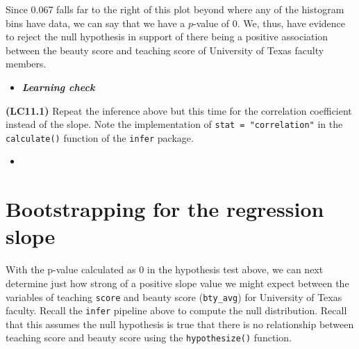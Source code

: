 \documentclass[12pt,]{krantz}
\makeatletter
\newenvironment{Shaded}{\begin{snugshade}}{\end{snugshade}}
\newcommand{\KeywordTok}[1]{\textcolor[rgb]{0.27,0.27,0.27}{\textbf{#1}}}
\newcommand{\DataTypeTok}[1]{\textcolor[rgb]{0.27,0.27,0.27}{#1}}
\newcommand{\DecValTok}[1]{\textcolor[rgb]{0.06,0.06,0.06}{#1}}
\newcommand{\StringTok}[1]{\textcolor[rgb]{0.5,0.5,0.5}{#1}}
\newcommand{\OperatorTok}[1]{\textcolor[rgb]{0.43,0.43,0.43}{\textbf{#1}}}
\newcommand{\NormalTok}[1]{#1}
\newenvironment{kframe}{%
\medskip{}
\setlength{\fboxsep}{.8em}
 \def\at@end@of@kframe{}%
 \ifinner\ifhmode%
  \def\at@end@of@kframe{\end{minipage}}%
  \begin{minipage}{\columnwidth}%
 \fi\fi%
 \def\FrameCommand##1{\hskip\@totalleftmargin \hskip-\fboxsep
 \colorbox{shadecolor}{##1}\hskip-\fboxsep
     \hskip-\linewidth \hskip-\@totalleftmargin \hskip\columnwidth}%
 \MakeFramed {\advance\hsize-\width
   \@totalleftmargin\z@ \linewidth\hsize
   \@setminipage}}%
 {\par\unskip\endMakeFramed%
 \at@end@of@kframe}
\renewenvironment{Shaded}{\begin{kframe}}{\end{kframe}}
\newenvironment{rmdblock}[1]
  {\begin{shaded*}
  \begin{itemize}
  \renewcommand{\labelitemi}{
    \raisebox{-.7\height}[0pt][0pt]{
    }
  }
  \item
  }
  {
  \end{itemize}
  \end{shaded*}
  }
\newenvironment{learncheck}
  {\begin{rmdblock}{warning}}
  {\end{rmdblock}}
\theoremstyle{definition}
\theoremstyle{definition}
\theoremstyle{definition}
\theoremstyle{remark}
\makeatother
\begin{document}
Since 0.067 falls far to the right of this plot beyond where any of the
histogram bins have data, we can say that we have a \(p\)-value of 0.
We, thus, have evidence to reject the null hypothesis in support of
there being a positive association between the beauty score and teaching
score of University of Texas faculty members.

\begin{learncheck}
\textbf{\emph{Learning check}}
\end{learncheck}

\textbf{(LC11.1)} Repeat the inference above but this time for the
correlation coefficient instead of the slope. Note the implementation of
\texttt{stat\ =\ "correlation"} in the \texttt{calculate()} function of
the \texttt{infer} package.

\begin{learncheck}

\end{learncheck}

\section{Bootstrapping for the regression
slope}\label{bootstrapping-for-the-regression-slope}

With the p-value calculated as 0 in the hypothesis test above, we can
next determine just how strong of a positive slope value we might expect
between the variables of teaching \texttt{score} and beauty score
(\texttt{bty\_avg}) for University of Texas faculty. Recall the
\texttt{infer} pipeline above to compute the null distribution. Recall
that this assumes the null hypothesis is true that there is no
relationship between teaching score and beauty score using the
\texttt{hypothesize()} function.

\begin{Shaded}
\end{Shaded}
\end{document}
